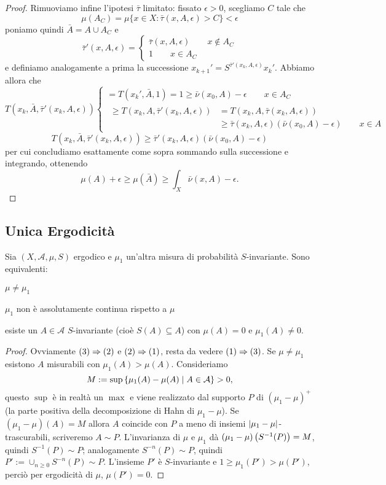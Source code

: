 \begin{proof}
Rimuoviamo infine l'ipotesi $\bar\tau$ limitato: fissato $\epsilon>0$, scegliamo $C$ tale che
\[\mu(A_C)=\mu\{x\in X: \bar\tau(x,A,\epsilon)>C\}<\epsilon\]
poniamo quindi $\bar A=A\cup A_C$ e
\[\bar\tau'(x,A,\epsilon)=\begin{cases}\bar\tau(x,A,\epsilon) \qquad x\notin A_C\\
					1 \qquad x\in A_C
  \end{cases}\]
e definiamo analogamente a prima la successione $x_{k+1}'=S^{\bar\tau'(x_k,A,\epsilon)}x_k'$. Abbiamo allora che
\[T(x_k,\bar A,\bar\tau'(x_k,A,\epsilon))
    \begin{cases} =T(x_k',\bar A,1)=1\geq \bar\nu(x_0,A)-\epsilon \qquad x\in A_C \\
		  \begin{aligned}\geq T(x_k,A,\bar\tau'(x_k,A,\epsilon))&=T(x_k,A,\bar\tau(x_k,A,\epsilon))\\
			&\geq \bar\tau(x_k,A,\epsilon)(\bar\nu(x_0,A)-\epsilon) \qquad x\in A \end{aligned}
    \end{cases}\]
\[T(x_k,\bar A,\bar\tau'(x_k,A,\epsilon))\geq \bar\tau'(x_k,A,\epsilon)(\bar\nu(x_0,A)-\epsilon)\]
per cui concludiamo esattamente come sopra sommando sulla successione e integrando, ottenendo
\[\mu(A)+\epsilon\geq\mu(\bar A)\geq \int_X \bar\nu(x,A)-\epsilon.\]
\end{proof}

\subsection{Unica Ergodicità}

\begin{teo}Sia $(X,\mathcal{A},\mu,S)$ ergodico e $\mu_1$ un'altra misura di probabilità $S$-invariante.
Sono equivalenti:
\begin{lista}
\item $\mu\neq\mu_1$
\item $\mu_1$ non è assolutamente continua rispetto a $\mu$
\item esiste un $A\in\mathcal{A}$ $S$-invariante (cioè $S(A)\subseteq A$) con $\mu(A)=0$ e $\mu_1(A)\neq 0$.
\end{lista}
\end{teo}

\begin{proof}Ovviamente $(3)\Rightarrow (2)$ e $(2)\Rightarrow (1)$, resta da vedere $(1)\Rightarrow (3)$.
Se $\mu\neq\mu_1$ esistono $A$ misurabili con $\mu_1(A)>\mu(A)$. Consideriamo 
\[M:=\sup\left\{\mu_1(A)-\mu(A)\mid A\in\mathcal{A}\right\}>0,\]
questo $\sup$ è in realtà un $\max$ e viene realizzato dal supporto $P$ di $(\mu_1-\mu)^+$ (la parte positiva della decomposizione di Hahn di $\mu_1-\mu$). 
Se $(\mu_1-\mu)(A)=M$ allora $A$ coincide con $P$ a meno di insiemi $\left|\mu_1-\mu\right|$-trascurabili, scriveremo $A\sim P$.
L'invarianza di $\mu$ e $\mu_1$ dà $(\mu_1-\mu)\left(S^{-1}(P)\right)=M$, quindi $S^{-1}(P)\sim P$; analogamente $S^{-n}(P)\sim P$,
quindi $P':=\cup_{n\ge 0}S^{-n}(P)\sim P$. L'insieme $P'$ è $S$-invariante e $1\ge \mu_1(P')>\mu(P')$, perciò per ergodicità di $\mu$, $\mu(P')=0$.
\end{proof}

